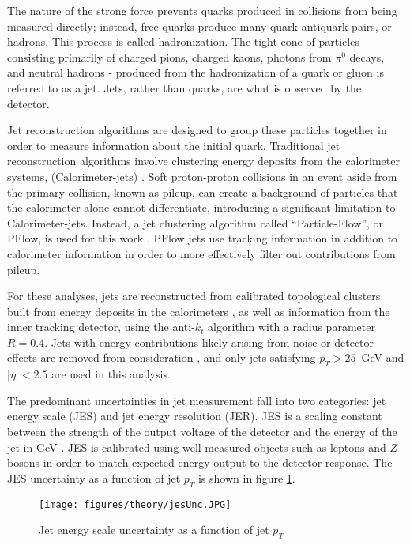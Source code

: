 The nature of the strong force prevents quarks produced in collisions from being measured directly; instead, free quarks produce many quark-antiquark pairs, or hadrons. This process is called hadronization. The tight cone of particles - consisting primarily of charged pions, charged kaons, photons from $\pi^0$ decays, and neutral hadrons - produced from the hadronization of a quark or gluon is referred to as a jet. Jets, rather than quarks, are what is observed by the detector.

Jet reconstruction algorithms are designed to group these particles together in order to measure information about the initial quark. Traditional jet reconstruction algorithms involve clustering energy deposits from the calorimeter systems, (Calorimeter-jets) \cite{PERF-2015-05}. Soft proton-proton collisions in an event aside from the primary collision, known as pileup, can create a background of particles that the calorimeter alone cannot differentiate, introducing a significant limitation to Calorimeter-jets. Instead, a jet clustering algorithm called ``Particle-Flow'', or PFlow, is used for this work \cite{PERF-2015-09}. PFlow jets use tracking information in addition to calorimeter information in order to more effectively filter out contributions from pileup.

For these analyses, jets are reconstructed from calibrated topological clusters built from energy deposits in the calorimeters \cite{ATL-PHYS-PUB-2015-015}, as well as information from the inner tracking detector, using the anti-$k_t$ algorithm with a radius parameter $R=0.4$. Jets with energy contributions likely arising from noise or detector effects are removed from consideration \cite{ATLAS-CONF-2015-029}, and only jets satisfying $p_T > 25$~GeV and $|\eta| < 2.5$ are used in this analysis.

The predominant uncertainties in jet measurement fall into two categories: jet energy scale (JES) and jet energy resolution (JER). JES is a scaling constant between the strength of the output voltage of the detector and the energy of the jet in GeV \cite{atlascollaboration2020jet}. JES is calibrated using well measured objects such as leptons and $Z$ bosons in order to match expected energy output to the detector response. The JES uncertainty as a function of jet $p_T$ is shown in figure \ref{fig:jesUnc}.

\begin{figure}[H]
\centering
   \texttt{[image: figures/theory/jesUnc.JPG]}
\caption{Jet energy scale uncertainty as a function of jet $p_T$ \cite{atlascollaboration2020jet}}
\label{fig:jesUnc}
\end{figure}

